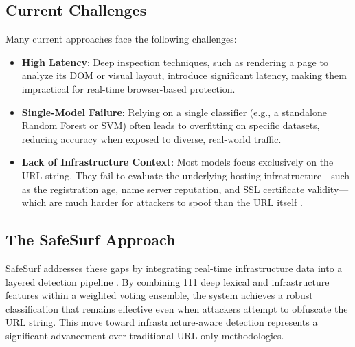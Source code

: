 \subsection{Current Challenges}
Many current approaches face the following challenges:
\begin{itemize}
    \item \textbf{High Latency}: Deep inspection techniques, such as rendering a page to analyze its DOM or visual layout, introduce significant latency, making them impractical for real-time browser-based protection.
    \item \textbf{Single-Model Failure}: Relying on a single classifier (e.g., a standalone Random Forest or SVM) often leads to overfitting on specific datasets, reducing accuracy when exposed to diverse, real-world traffic.
    \item \textbf{Lack of Infrastructure Context}: Most models focus exclusively on the URL string. They fail to evaluate the underlying hosting infrastructure—such as the registration age, name server reputation, and SSL certificate validity—which are much harder for attackers to spoof than the URL itself \cite{ref7, ref8}.
\end{itemize}

\subsection{The SafeSurf Approach}
SafeSurf addresses these gaps by integrating real-time infrastructure data into a layered detection pipeline \cite{ref6, ref17}. By combining 111 deep lexical and infrastructure features within a weighted voting ensemble, the system achieves a robust classification that remains effective even when attackers attempt to obfuscate the URL string. This move toward infrastructure-aware detection represents a significant advancement over traditional URL-only methodologies.

